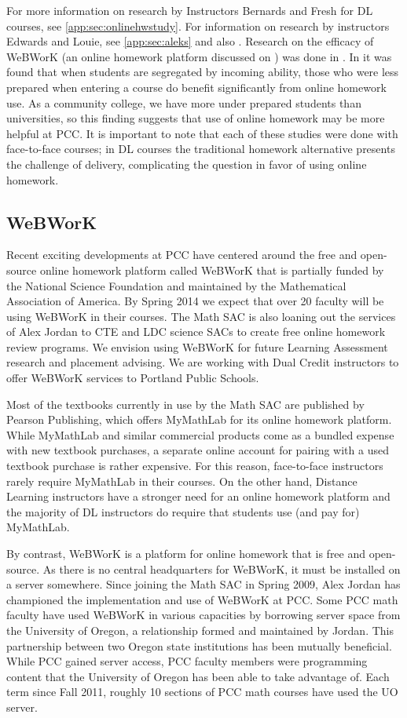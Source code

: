 For more information on research by Instructors Bernards and Fresh for DL
courses, see \vref{app:sec:onlinehwstudy}. For information on research by
instructors Edwards and Louie, see \vref{app:sec:aleks} and also
. Research on the efficacy of WeBWorK (an online
homework platform discussed on ) was done in
\cite{focuswebwork}.  In \cite{brewer} it was found that when students are
segregated by incoming ability, those who were less prepared when entering a
course do benefit significantly from online homework use. As a community
college, we have more under prepared students than universities, so this
finding suggests that use of online homework may be more helpful at PCC. It is
important to note that each of these studies were done with face-to-face
courses; in DL courses the traditional homework alternative presents the
challenge of delivery, complicating the question in favor of using online
homework.

\subsection{WeBWorK}\label{other:sec:webwork}
Recent exciting developments at PCC have centered around the free and
open-source online homework platform called WeBWorK that is partially funded by
the National Science Foundation and maintained by the Mathematical Association
of America. By Spring 2014 we expect that over 20 faculty will be using WeBWorK
in their courses. The Math SAC is also loaning out the services of Alex Jordan
to CTE and LDC science SACs to create free online homework review programs. We
envision using WeBWorK for future Learning Assessment research and placement
advising. We are working with Dual Credit instructors to offer WeBWorK services
to Portland Public Schools.

Most of the textbooks currently in use by the Math SAC are published by Pearson
Publishing, which offers MyMathLab for its online homework platform. While
MyMathLab and similar commercial products come as a bundled expense with new
textbook purchases, a separate online account for pairing with a used textbook
purchase is rather expensive. For this reason, face-to-face instructors rarely
require MyMathLab in their courses. On the other hand, Distance Learning
instructors have a stronger need for an online homework platform and the
majority of DL instructors do require that students use (and pay for) MyMathLab.

By contrast, WeBWorK is a platform for online homework that is free and
open-source. As there is no central headquarters for WeBWorK, it must be
installed on a server somewhere. Since joining the Math SAC in Spring 2009,
Alex Jordan has championed the implementation and use of WeBWorK at PCC. Some
PCC math faculty have used WeBWorK in various capacities by borrowing server
space from the University of Oregon, a relationship formed and maintained by
Jordan. This partnership between two Oregon state institutions has been
mutually beneficial. While PCC gained server access, PCC faculty members were
programming content that the University of Oregon has been able to take advantage of. Each term since
Fall 2011, roughly 10 sections of PCC math courses have used the UO server.

